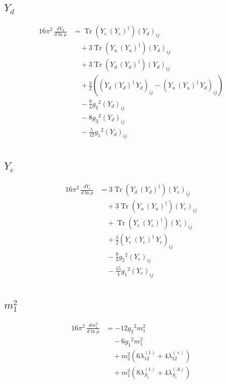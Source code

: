 \documentclass[10pt,a4paper]{article}
\begin{document}
\subsection*{$Y_d$}
\begin{align*}
16\pi^2\,\frac{d Y_d}{d\ln\mu} &=\operatorname{Tr}\!\left({Y_e}\,\left({Y_e}\right)^{\dagger}\right) \left({Y_d}\right)_{ij} \\
&\quad +3 \operatorname{Tr}\!\left({Y_u}\,\left({Y_u}\right)^{\dagger}\right) \left({Y_d}\right)_{ij} \\
&\quad +3 \operatorname{Tr}\!\left({Y_d}\,\left({Y_d}\right)^{\dagger}\right) \left({Y_d}\right)_{ij} \\
&\quad +\frac{3}{2} (\left({Y_d}\,\left({Y_d}\right)^{\dagger}\,{Y_d}\right)_{ij}-\left({Y_u}\,\left({Y_u}\right)^{\dagger}\,{Y_d}\right)_{ij}) \\
&\quad -\frac{9}{4} {g_2}^2 \left({Y_d}\right)_{ij} \\
&\quad -8 {g_3}^2 \left({Y_d}\right)_{ij} \\
&\quad -\frac{5}{12} {g_1}^2 \left({Y_d}\right)_{ij} \\
\end{align*}
\subsection*{$Y_e$}
\begin{align*}
16\pi^2\,\frac{d Y_e}{d\ln\mu} &=3 \operatorname{Tr}\!\left({Y_d}\,\left({Y_d}\right)^{\dagger}\right) \left({Y_e}\right)_{ij} \\
&\quad +3 \operatorname{Tr}\!\left({Y_u}\,\left({Y_u}\right)^{\dagger}\right) \left({Y_e}\right)_{ij} \\
&\quad +\operatorname{Tr}\!\left({Y_e}\,\left({Y_e}\right)^{\dagger}\right) \left({Y_e}\right)_{ij} \\
&\quad +\frac{3}{2} \left({Y_e}\,\left({Y_e}\right)^{\dagger}\,{Y_e}\right)_{ij} \\
&\quad -\frac{9}{4} {g_2}^2 \left({Y_e}\right)_{ij} \\
&\quad -\frac{15}{4} {g_1}^2 \left({Y_e}\right)_{ij} \\
\end{align*}
\subsection*{$m_1^2$}
\begin{align*}
16\pi^2\,\frac{d m_1^2}{d\ln\mu} &=-12 {g_2}^2 {m_1^2} \\
&\quad -6 {g_1}^2 {m_1^2} \\
&\quad +{m_2^2} (6 {\lambda_{12}^{(1)}}+4 {\lambda_{12}^{(\times)}}) \\
&\quad +{m_1^2} (8 {\lambda_{S_1}^{(1)}}+4 {\lambda_{S_1}^{(A)}}) \\
\end{align*}
\end{document}
